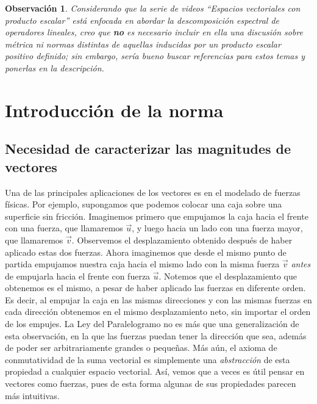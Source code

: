 \documentclass[12pt,dvipsnames]{article}
\newtheorem{obs}{Observación}[section]
\numberwithin{equation}{section}
\begin{document}
\begin{obs}
Considerando que la serie de videos ``Espacios vectoriales con producto escalar'' está enfocada en abordar la descomposición espectral de operadores lineales, creo que \textbf{no} es necesario incluir en ella una discusión sobre métrica ni normas distintas de aquellas inducidas por un producto escalar positivo definido; sin embargo, sería bueno buscar referencias para estos temas y ponerlas en la descripción.
\end{obs}


\newpage
\section{Introducción de la norma}

\subsection{Necesidad de caracterizar las magnitudes de vectores}

Una de las principales aplicaciones de los vectores es en el modelado de fuerzas físicas. Por ejemplo, supongamos que podemos colocar una caja sobre una superficie sin fricción. Imaginemos primero que empujamos la caja hacia el frente con una fuerza, que llamaremos $\vec{u}$, y luego hacia un lado con una fuerza mayor, que llamaremos $\vec{v}$. Observemos el desplazamiento obtenido después de haber aplicado estas dos fuerzas. Ahora imaginemos que desde el mismo punto de partida empujamos nuestra caja hacia el mismo lado con la misma fuerza $\vec{v}$ \emph{antes} de empujarla hacia el frente con fuerza $\vec{u}$. Notemos que el desplazamiento que obtenemos es el mismo, a pesar de haber aplicado las fuerzas en diferente orden. Es decir, al empujar la caja en las mismas direcciones y con las mismas fuerzas en cada dirección obtenemos en el mismo desplazamiento neto, sin importar el orden de los empujes. La Ley del Paralelogramo no es más que una generalización de esta observación, en la que las fuerzas puedan tener la dirección que sea, además de poder ser arbitrariamente grandes o pequeñas. Más aún, el axioma de conmutatividad de la suma vectorial es simplemente una \emph{abstracción} de esta propiedad a cualquier espacio vectorial. Así, vemos que a veces es útil pensar en vectores como fuerzas, pues de esta forma algunas de sus propiedades parecen más intuitivas. 
\end{document}

